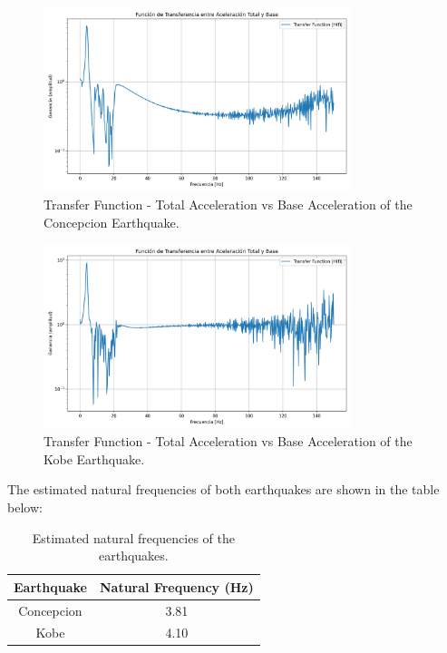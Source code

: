 \documentclass{article}  %
\begin{document}
\begin{figure}[H]
  \centering
  \includegraphics[width=0.8\textwidth]{GRAFICOS/TransferFunction_TFEstimate.png}
  \caption{Transfer Function - Total Acceleration vs Base Acceleration of the Concepcion Earthquake.}
  \label{fig:transfer}
\end{figure}

\begin{figure}[H]
  \centering
  \includegraphics[width=0.8\textwidth]{GRAFICOS/TransferFunction_TFEstimate_Kobe.png}
  \caption{Transfer Function - Total Acceleration vs Base Acceleration of the Kobe Earthquake.}
  \label{fig:transfer_kobe}
\end{figure}

The estimated natural frequencies of both earthquakes are shown in the table below:

\begin{table}[H]
\centering
\caption{Estimated natural frequencies of the earthquakes.}
\begin{tabular}{|c|c|}
\hline
\textbf{Earthquake} & \textbf{Natural Frequency (Hz)} \\ \hline
Concepcion & 3.81 \\ \hline
Kobe & 4.10 \\ \hline
\end{tabular}
\end{table}
\end{document}
